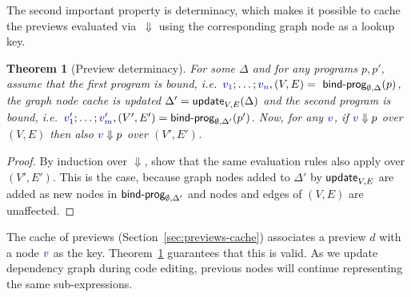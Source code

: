 \documentclass[english,crc]{programming}
\newcounter{thc}
\theoremstyle{plain}
\newtheorem{theorem}[thc]{Theorem}
\theoremstyle{definition}
\newcommand{\ident}[1]{\textnormal{\textcolor{idclr}{\sffamily #1}}}
\newcommand{\bndclr}[1]{\textcolor{kvdclr}{#1}}
\begin{document}
The second important property is determinacy, which makes it possible to cache the previews
evaluated via~$\Downarrow$ using the corresponding graph node as a lookup key.

\begin{theorem}[Preview determinacy]
\label{thm:determinacy}
For some $\Delta$ and for any programs $p, p'$, assume that the first program is bound,
i.e.~$\bndclr{v_1};\ldots;\bndclr{v_n}, (V, E) = \ident{bind-prog}_{\emptyset, \Delta}(p)$,
the graph node cache is updated $\Delta' = \ident{update}_{V, E}(\Delta)$ and the second program is
bound, i.e.~$\bndclr{v'_1};\ldots;\bndclr{v'_m}, (V', E') = \ident{bind-prog}_{\emptyset, \Delta'}(p')$.
Now, for any $\bndclr{v}$, if $\bndclr{v} \Downarrow p$ over $(V, E)$ then also
 $\bndclr{v} \Downarrow p$ over $(V', E')$.
\end{theorem}
\begin{proof}
By induction over $\Downarrow$, show that the same evaluation rules also
apply over $(V', E')$. This is the case, because graph nodes added to $\Delta'$ by $\ident{update}_{V, E}$
are added as new nodes in $\ident{bind-prog}_{\emptyset, \Delta'}$ and
nodes and edges of $(V, E)$ are unaffected.
\end{proof}

\noindent
The cache of previews (Section~\ref{sec:previews-cache}) associates a preview $d$ with a node
$\bndclr{v}$ as the key. Theorem~\ref{thm:determinacy} guarantees that this is valid. As we update dependency
graph during code editing, previous nodes will continue representing the same sub-expressions.


\end{document}
